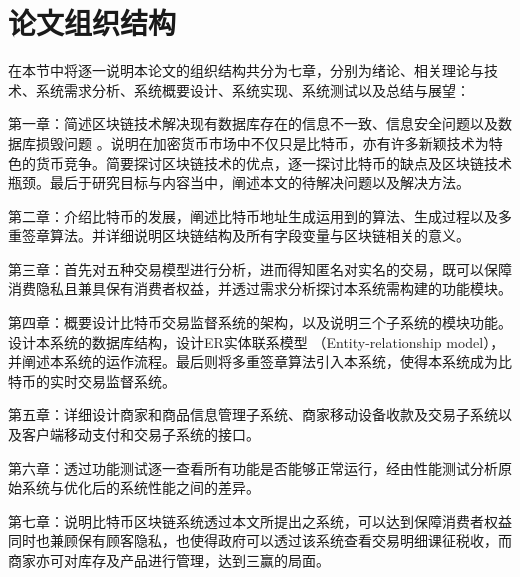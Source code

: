	\section{论文组织结构}
	在本节中将逐一说明本论文的组织结构共分为七章，分别为绪论、相关理论与技术、系统需求分析、系统概要设计、系统实现、系统测试以及总结与展望：

	第一章：简述区块链技术解决现有数据库存在的信息不一致、信息安全问题以及数据库损毁问题
	。说明在加密货币市场中不仅只是比特币，亦有许多新颖技术为特色的货币竞争。简要探讨区块链技术的优点，逐一探讨比特币的缺点及区块链技术瓶颈。最后于研究目标与内容当中，阐述本文的待解决问题以及解决方法。

	第二章：介绍比特币的发展，阐述比特币地址生成运用到的算法、生成过程以及多重签章算法。并详细说明区块链结构及所有字段变量与区块链相关的意义。

	第三章：首先对五种交易模型进行分析，进而得知匿名对实名的交易，既可以保障消费隐私且兼具保有消费者权益，并透过需求分析探讨本系统需构建的功能模块。

	第四章：概要设计比特币交易监督系统的架构，以及说明三个子系统的模块功能。设计本系统的数据库结构，设计ER实体联系模型 （Entity-relationship model），并阐述本系统的运作流程。最后则将多重签章算法引入本系统，使得本系统成为比特币的实时交易监督系统。

	第五章：详细设计商家和商品信息管理子系统、商家移动设备收款及交易子系统以及客户端移动支付和交易子系统的接口。

	第六章：透过功能测试逐一查看所有功能是否能够正常运行，经由性能测试分析原始系统与优化后的系统性能之间的差异。

	第七章：说明比特币区块链系统透过本文所提出之系统，可以达到保障消费者权益同时也兼顾保有顾客隐私，也使得政府可以透过该系统查看交易明细课征税收，而商家亦可对库存及产品进行管理，达到三赢的局面。
